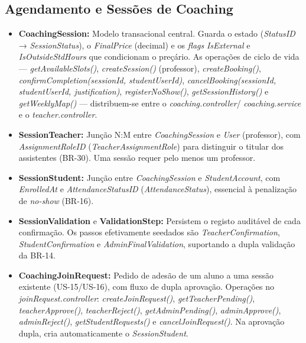 \documentclass[12pt,a4paper]{report}
\begin{document}
\subsection{Agendamento e Sessões de Coaching}
\begin{itemize}
    \item \textbf{CoachingSession:} Modelo transacional central. Guarda o estado
    (\textit{StatusID} → \textit{SessionStatus}), o \textit{FinalPrice} (decimal) e
    os \textit{flags} \textit{IsExternal} e \textit{IsOutsideStdHours} que
    condicionam o preçário. As operações de ciclo de vida ---
    \textit{getAvailableSlots()}, \textit{createSession()} (professor),
    \textit{createBooking()},
    \textit{confirmCompletion(sessionId, studentUserId)},
    \textit{cancelBooking(sessionId, studentUserId, justification)},
    \textit{registerNoShow()}, \textit{getSessionHistory()} e
    \textit{getWeeklyMap()} --- distribuem-se entre o \textit{coaching.controller}/
    \textit{coaching.service} e o \textit{teacher.controller}.

    \item \textbf{SessionTeacher:} Junção N:M entre \textit{CoachingSession} e
    \textit{User} (professor), com \textit{AssignmentRoleID}
    (\textit{TeacherAssignmentRole}) para distinguir o titular dos assistentes
    (BR-30). Uma sessão requer pelo menos um professor.

    \item \textbf{SessionStudent:} Junção entre \textit{CoachingSession} e
    \textit{StudentAccount}, com \textit{EnrolledAt} e \textit{AttendanceStatusID}
    (\textit{AttendanceStatus}), essencial à penalização de \textit{no-show}
    (BR-16).

    \item \textbf{SessionValidation} e \textbf{ValidationStep:} Persistem o registo
    auditável de cada confirmação. Os passos efetivamente seedados são
    \textit{TeacherConfirmation}, \textit{StudentConfirmation} e
    \textit{AdminFinalValidation}, suportando a dupla validação da BR-14.

    \item \textbf{CoachingJoinRequest:} Pedido de adesão de um aluno a uma sessão
    existente (US-15/US-16), com fluxo de dupla aprovação. Operações no
    \textit{joinRequest.controller}: \textit{createJoinRequest()},
    \textit{getTeacherPending()}, \textit{teacherApprove()},
    \textit{teacherReject()}, \textit{getAdminPending()}, \textit{adminApprove()},
    \textit{adminReject()}, \textit{getStudentRequests()} e
    \textit{cancelJoinRequest()}. Na aprovação dupla, cria automaticamente o
    \textit{SessionStudent}.


\end{itemize}
\end{document}
